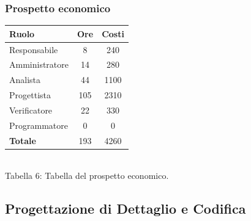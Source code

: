 \subsubsection{Prospetto economico}
\begin{center}
\begin{tabular}{| l | c | c |}
\hline
Ruolo & Ore & Costi \\
\hline
Responsabile & 8 & 240 \\
Amministratore & 14 & 280 \\
Analista & 44 & 1100 \\
Progettista & 105 & 2310 \\
Verificatore & 22 & 330 \\
Programmatore & 0 & 0 \\
\hline
\textbf{Totale} & 193 & 4260 \\
\hline
\end{tabular}
\\
Tabella 6: Tabella del prospetto economico.
\end{center}
\subsection{Progettazione di Dettaglio e Codifica}
